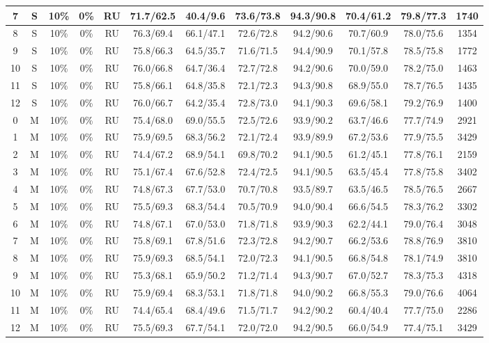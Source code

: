 \begin{table*}
{\begin{tabular}{|c|c|c|c|c||c|c|c|c|c|c||c|}
7 & S & 10\% & 0\% & RU & 71.7/62.5 & 40.4/9.6 & 73.6/73.8 & 94.3/90.8 & 70.4/61.2 & 79.8/77.3 & 1740 \\ \hline
8 & S & 10\% & 0\% & RU & 76.3/69.4 & 66.1/47.1 & 72.6/72.8 & 94.2/90.6 & 70.7/60.9 & 78.0/75.6 & 1354 \\ \hline
9 & S & 10\% & 0\% & RU & 75.8/66.3 & 64.5/35.7 & 71.6/71.5 & 94.4/90.9 & 70.1/57.8 & 78.5/75.8 & 1772 \\ \hline
10 & S & 10\% & 0\% & RU & 76.0/66.8 & 64.7/36.4 & 72.7/72.8 & 94.2/90.6 & 70.0/59.0 & 78.2/75.0 & 1463 \\ \hline
11 & S & 10\% & 0\% & RU & 75.8/66.1 & 64.8/35.8 & 72.1/72.3 & 94.3/90.8 & 68.9/55.0 & 78.7/76.5 & 1435 \\ \hline
12 & S & 10\% & 0\% & RU & 76.0/66.7 & 64.2/35.4 & 72.8/73.0 & 94.1/90.3 & 69.6/58.1 & 79.2/76.9 & 1400 \\ \hline
0 & M & 10\% & 0\% & RU & 75.4/68.0 & 69.0/55.5 & 72.5/72.6 & 93.9/90.2 & 63.7/46.6 & 77.7/74.9 & 2921 \\ \hline
1 & M & 10\% & 0\% & RU & 75.9/69.5 & 68.3/56.2 & 72.1/72.4 & 93.9/89.9 & 67.2/53.6 & 77.9/75.5 & 3429 \\ \hline
2 & M & 10\% & 0\% & RU & 74.4/67.2 & 68.9/54.1 & 69.8/70.2 & 94.1/90.5 & 61.2/45.1 & 77.8/76.1 & 2159 \\ \hline
3 & M & 10\% & 0\% & RU & 75.1/67.4 & 67.6/52.8 & 72.4/72.5 & 94.1/90.5 & 63.5/45.4 & 77.8/75.8 & 3402 \\ \hline
4 & M & 10\% & 0\% & RU & 74.8/67.3 & 67.7/53.0 & 70.7/70.8 & 93.5/89.7 & 63.5/46.5 & 78.5/76.5 & 2667 \\ \hline
5 & M & 10\% & 0\% & RU & 75.5/69.3 & 68.3/54.4 & 70.5/70.9 & 94.0/90.4 & 66.6/54.5 & 78.3/76.2 & 3302 \\ \hline
6 & M & 10\% & 0\% & RU & 74.8/67.1 & 67.0/53.0 & 71.8/71.8 & 93.9/90.3 & 62.2/44.1 & 79.0/76.4 & 3048 \\ \hline
7 & M & 10\% & 0\% & RU & 75.8/69.1 & 67.8/51.6 & 72.3/72.8 & 94.2/90.7 & 66.2/53.6 & 78.8/76.9 & 3810 \\ \hline
8 & M & 10\% & 0\% & RU & 75.9/69.3 & 68.5/54.1 & 72.0/72.3 & 94.1/90.5 & 66.8/54.8 & 78.1/74.9 & 3810 \\ \hline
9 & M & 10\% & 0\% & RU & 75.3/68.1 & 65.9/50.2 & 71.2/71.4 & 94.3/90.7 & 67.0/52.7 & 78.3/75.3 & 4318 \\ \hline
10 & M & 10\% & 0\% & RU & 75.9/69.4 & 68.3/53.1 & 71.8/71.8 & 94.0/90.2 & 66.8/55.3 & 79.0/76.6 & 4064 \\ \hline
11 & M & 10\% & 0\% & RU & 74.4/65.4 & 68.4/49.6 & 71.5/71.7 & 94.2/90.2 & 60.4/40.4 & 77.7/75.0 & 2286 \\ \hline
12 & M & 10\% & 0\% & RU & 75.5/69.3 & 67.7/54.1 & 72.0/72.0 & 94.2/90.5 & 66.0/54.9 & 77.4/75.1 & 3429 \\ \hline
\end{tabular}}
\end{table*}

